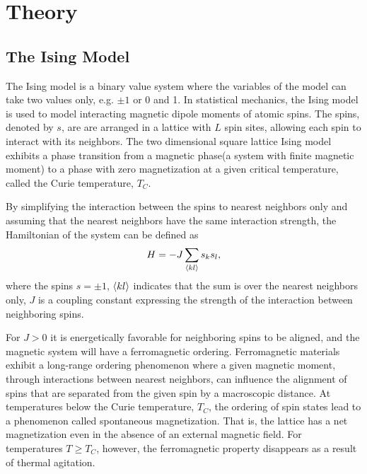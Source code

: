 \section{Theory}\label{sec:Theory}

\subsection{The Ising Model}\label{sec:ising theory}
The Ising model is a binary value system where the variables of the model can take two values only, e.g. $\pm 1$ or 0 and 1. In statistical mechanics, the Ising model is used to model interacting magnetic dipole moments of atomic spins. The spins, denoted by $s$, are are arranged in a lattice with $L$ spin sites, allowing each spin to interact with its neighbors. The two dimensional square lattice Ising model exhibits a phase transition from a magnetic phase(a system with finite magnetic moment) to a phase with zero magnetization at a given critical temperature, called the Curie temperature, $T_C$. \cite{PROJising}

By simplifying the interaction between the spins to nearest neighbors only and assuming that the nearest neighbors have the same interaction strength, the Hamiltonian of the system can be defined as
\begin{equation}\label{eq:ising energy}
    H = - J \sum_{\ev{kl}} s_k s_l,
\end{equation}
where the spins $s=\pm 1$, $\ev{kl}$ indicates that the sum is over the nearest neighbors only, $J$ is a coupling constant expressing the strength of the interaction between neighboring spins. 

For $J>0$ it is energetically favorable for neighboring spins to be aligned, and the magnetic system will have a ferromagnetic ordering. Ferromagnetic materials exhibit a long-range ordering phenomenon where a given magnetic moment, through interactions between nearest neighbors, can influence the alignment of spins that are separated from the given spin by a macroscopic distance.
At temperatures below the Curie temperature, $T_C$, the ordering of spin states lead to a phenomenon called spontaneous magnetization. That is, the lattice has a net magnetization even in the absence of an external magnetic field. For temperatures $T\geq T_C$, however, the ferromagnetic property disappears as a result of thermal agitation. \cite{PROJising}

